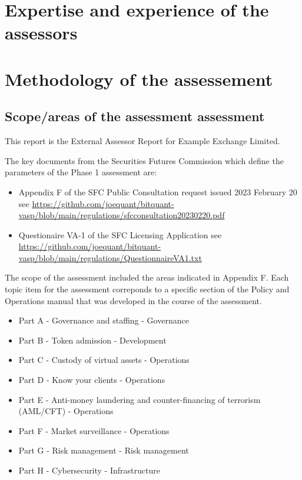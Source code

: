 \documentclass[]{report}
\def\firmfullname{Example Exchange Limited}
\begin{document}
\chapter{Expertise and experience of the assessors}


\chapter{Methodology of the assessement}
\section{Scope/areas of the assessment assessment}

This report is the External Assessor Report for \firmfullname.  

The key documents from the Securities Futures Commission which define
the parameters of the Phase 1 assessment are:

\begin{itemize}
  \item Appendix F of the SFC Public Consultation request issued
    2023 February 20 see
    \href{https://github.com/joequant/bitquant-vasp/blob/main/regulations/sfc\-consultation\-20230220.pdf}{https://github.com/joequant/bitquant-vasp/blob/main/regulations/sfc\-consultation\-20230220.pdf}
  \item Questionaire VA-1 of the SFC Licensing Application see
    \href{https://github.com/joequant/bitquant-vasp/blob/main/regulations/Questionnaire\-VA\-1.txt}{https://github.com/joequant/bitquant-vasp/blob/main/regulations/Questionnaire\-VA\-1.txt}
\end{itemize}

The scope of the assessment included the areas indicated in Appendix
F.  Each topic item for the assessment correponds to a specific
section of the Policy and Operations manual that was developed in the
course of the assessment.

\begin{itemize}
\item Part A - Governance and staffing - Governance
\item Part B - Token admission - Development
\item Part C - Custody of virtual assets - Operations
\item Part D - Know your clients - Operations
\item Part E - Anti-money laundering and counter-financing of
  terrorism (AML/CFT) - Operations
\item Part F - Market surveillance - Operations
\item Part G - Risk management - Risk management
\item Part H - Cybersecurity - Infrastructure
\end{itemize}
\end{document}
